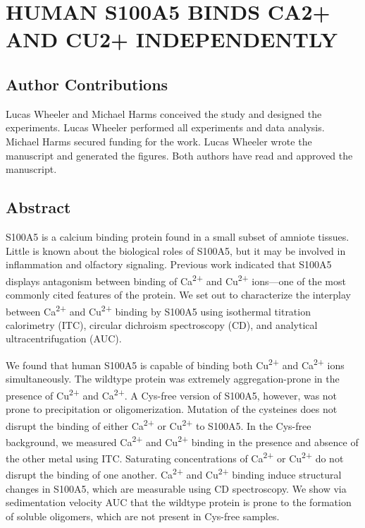 \chapter{HUMAN S100A5 BINDS CA2+ AND CU2+ INDEPENDENTLY}

\section{Author Contributions}
Lucas Wheeler and Michael Harms conceived the study and designed the experiments. Lucas Wheeler performed all experiments and data analysis. Michael Harms secured funding for the work. Lucas Wheeler wrote the manuscript and generated the figures. Both authors have read and approved the manuscript. 

\section{Abstract}

S100A5 is a calcium binding protein found in a small subset of amniote
tissues. Little is known about the biological roles of S100A5, but
it may be involved in inflammation and olfactory signaling. Previous
work indicated that S100A5 displays antagonism between binding of
Ca\textsuperscript{2+} and Cu\textsuperscript{2+} ions---one of the
most commonly cited features of the protein. We set out to characterize
the interplay between Ca\textsuperscript{2+} and Cu\textsuperscript{2+} 
binding by S100A5 using isothermal titration calorimetry (ITC), circular
dichroism spectroscopy (CD), and analytical ultracentrifugation (AUC). 

We found that human S100A5 is capable of binding both Cu\textsuperscript{2+} 
and Ca\textsuperscript{2+} ions simultaneously. The wildtype protein
was extremely aggregation-prone in the presence of Cu\textsuperscript{2+} 
and Ca\textsuperscript{2+}. A Cys-free version of S100A5, however,
was not prone to precipitation or oligomerization. Mutation of the
cysteines does not disrupt the binding of either Ca\textsuperscript{2+} 
or Cu\textsuperscript{2+} to S100A5. In the Cys-free background,
we measured Ca\textsuperscript{2+} and Cu\textsuperscript{2+} binding
in the presence and absence of the other metal using ITC. Saturating
concentrations of Ca\textsuperscript{2+} or Cu\textsuperscript{2+} 
do not disrupt the binding of one another. Ca\textsuperscript{2+} 
and Cu\textsuperscript{2+} binding induce structural changes in S100A5,
which are measurable using CD spectroscopy. We show via sedimentation
velocity AUC that the wildtype protein is prone to the formation of
soluble oligomers, which are not present in Cys-free samples.

